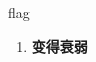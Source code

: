 
\begin{frame}
{\huge flag}
\begin{center}
\begin{enumerate}\Large
  \item \textbf{变得衰弱}
\end{enumerate}
\end{center}
\end{frame}
